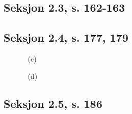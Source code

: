\documentclass[a4paper, 12pt]{article}  %
\begin{document}
\subsection*{Seksjon 2.3, s. 162-163}
\begin{enumerate}
    \item [\boxed{12}]
    \item [\boxed{40}]
    \item [\boxed{44}]
\end{enumerate}

\subsection*{Seksjon 2.4, s. 177, 179}
\begin{enumerate}
    \item [\boxed{12}]
          \begin{enumerate}
              \item [(c)]
          \end{enumerate}
    \item [\boxed{33}]
          \begin{enumerate}
              \item [(d)]
          \end{enumerate}
\end{enumerate}

\subsection*{Seksjon 2.5, s. 186}
\begin{enumerate}
    \item [\boxed{16}]
\end{enumerate}

\end{document}
